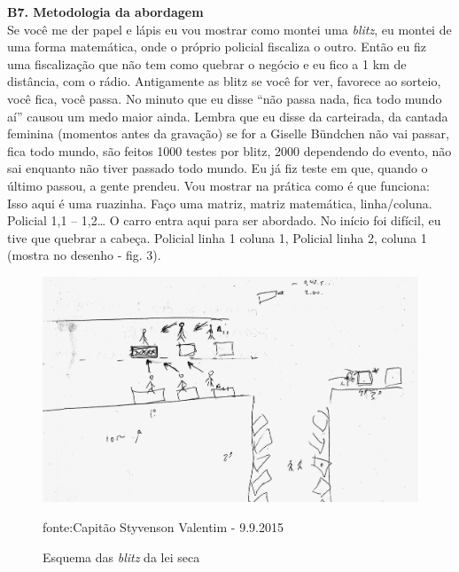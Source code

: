 \documentclass[
	12pt,				%
	openright,			%
	twoside,			%
	a4paper,			%
	chapter=TITLE,		%
	section=TITLE,		%
	subsection=TITLE,	%
	subsubsection=TITLE,%
	spanish,            %
	english,			%
	brazil				%
	]{abntex2}
\begin{document}
\begin{anexosenv}
	\hypertarget{B7}{}
	\par
	\textbf{B7. Metodologia da abordagem} \\
	Se você me der papel e lápis eu vou mostrar como montei uma \textit{blitz}, eu montei de uma forma matemática, onde o próprio policial fiscaliza o outro. Então eu fiz uma fiscalização que não tem como quebrar o negócio e eu fico a 1 km de distância, com o rádio. Antigamente as blitz se você for ver, favorece ao sorteio, você fica, você passa. No minuto que eu disse “não passa nada, fica todo mundo aí” causou um medo maior ainda. Lembra que eu disse da carteirada, da cantada feminina (momentos antes da gravação) se for a Giselle B\"{u}ndchen não vai passar, fica todo mundo, são feitos 1000 testes por blitz, 2000 dependendo do evento, não sai enquanto não tiver passado todo mundo. Eu já fiz teste em que, quando o último passou, a gente prendeu. Vou mostrar na prática como é que funciona: Isso aqui é uma ruazinha. Faço uma matriz, matriz matemática, linha/coluna. Policial 1,1 – 1,2… O carro entra aqui para ser abordado. No início foi difícil, eu tive que quebrar a cabeça. Policial linha 1 coluna 1, Policial linha 2, coluna 1 (mostra no desenho - fig. 3).
		\begin{figure}[!htpb]%
		\caption{Esquema das \textit{blitz} da lei seca}
		\begin{center}
		\includegraphics[scale=0.2]{blitz1}
		\end{center}
		\ABNTEXchapterfont\small{fonte:Capitão Styvenson Valentim - 9.9.2015}
		\label{blitz}
	\end{figure}  

\end{anexosenv}
\end{document}
